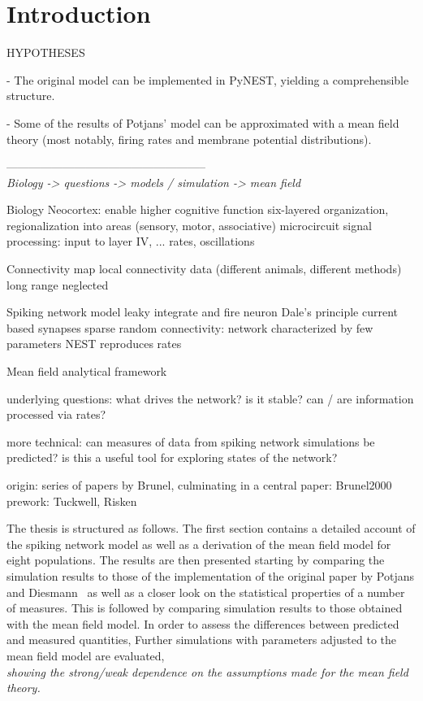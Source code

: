 \section{Introduction}
\label{sec:intro}

HYPOTHESES

- The original model can be implemented in PyNEST, yielding a 
comprehensible structure.

- Some of the results of Potjans' model can be approximated with a 
mean field theory (most notably, firing rates and membrane potential
distributions).


-----------------------------------------------------\\

\emph{Biology -> questions -> models / simulation -> mean field}


Biology
Neocortex: 
enable higher cognitive function
six-layered organization, 
regionalization into areas 
(sensory, motor, associative)
\cite{lui2011development}
microcircuit
signal processing: input to layer IV, ...
rates, oscillations

Connectivity map
local connectivity data (different animals, different methods)
long range neglected

Spiking network model
leaky integrate and fire neuron
Dale's principle
current based synapses
sparse random connectivity: network characterized by few parameters
NEST
reproduces rates

Mean field
analytical framework

underlying questions: 
    what drives the network?
    is it stable?
    can / are information processed via rates?

more technical:
    can measures of data from spiking network simulations be predicted?
    is this a useful tool for exploring states of the network?

origin:
series of papers by Brunel, culminating in a central paper: Brunel2000 
prework: Tuckwell, Risken 




The thesis is structured as follows. The first section contains a detailed account 
of the spiking network model as well as a derivation of the mean field model 
for eight populations.  
The results are then presented starting by comparing the simulation results to 
those of the implementation of the original paper by Potjans and 
Diesmann~\cite{potjans2014} as well as a closer look on the statistical properties 
of a number of measures. This is followed by comparing simulation results to those
obtained with the mean field model. In order to assess the differences between 
predicted and measured quantities, 
Further simulations with parameters adjusted 
to the mean field model are evaluated, 
\\\emph{showing the strong/weak dependence on the assumptions made for the mean
field theory.}




